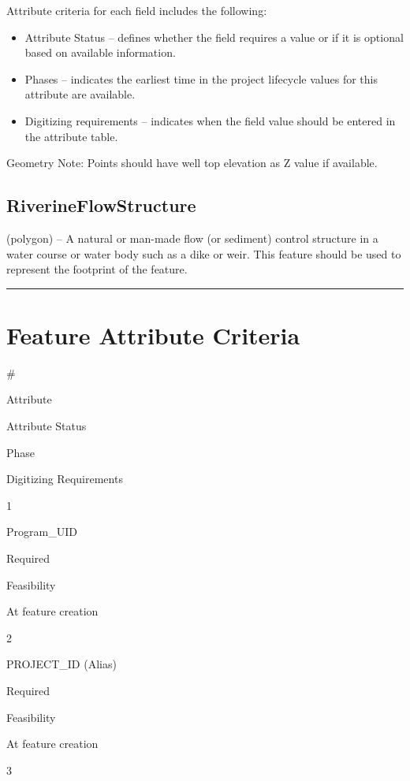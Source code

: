 \documentclass[
  letterpaper,
  DIV=11,
  numbers=noendperiod]{scrreprt}
\providecommand{\tightlist}{%
  \setlength{\itemsep}{0pt}\setlength{\parskip}{0pt}}
\begin{document}
Attribute criteria for each field includes the following:

\begin{itemize}
\tightlist
\item
  Attribute Status -- defines whether the field requires a value or if
  it is optional based on available information.
\item
  Phases -- indicates the earliest time in the project lifecycle values
  for this attribute are available.
\item
  Digitizing requirements -- indicates when the field value should be
  entered in the attribute table.
\end{itemize}

Geometry Note: Points should have well top elevation as Z value if
available.

\subsection{RiverineFlowStructure}\label{riverineflowstructure}

(polygon) -- A natural or man-made flow (or sediment) control structure
in a water course or water body such as a dike or weir. This feature
should be used to represent the footprint of the feature.

\begin{center}\rule{0.5\linewidth}{0.5pt}\end{center}

\section{Feature Attribute
Criteria}\label{feature-attribute-criteria-12}

\#

Attribute

Attribute Status

Phase

Digitizing Requirements

1

Program\_UID

Required

Feasibility

At feature creation

2

PROJECT\_ID (Alias)

Required

Feasibility

At feature creation

3
\end{document}
